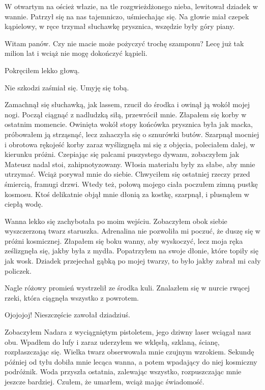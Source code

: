 W otwartym na oścież włazie, na tle rozgwieżdżonego nieba, lewitował dziadek w wannie.
Patrzył się na nas tajemniczo, uśmiechając się. Na głowie miał czepek kąpielowy, w ręce trzymał słuchawkę prysznica, wszędzie były góry piany.
\begin{dialogue}
\ds{} Witam panów. Czy nie macie może pożyczyć trochę szamponu? Lecę już tak milion lat i wciąż nie mogę dokończyć kąpieli.
\end{dialogue}
Pokręciłem lekko głową.
\begin{dialogue}
\ds{} Nie szkodzi \dm{} zaśmiał się. \dm{} Umyję się tobą.
\end{dialogue}
Zamachnął się słuchawką, jak lassem, rzucił do środka i owinął ją wokół mojej nogi.
Począł ciągnąć z nadludzką siłą, przewrócił mnie. Złapałem się korby w ostatnim momencie.
Owinięta wokół stopy końcówka prysznica była jak macka, próbowałem ją strząsnąć, lecz zahaczyła się o sznurówki butów.
Szarpnął mocniej i obrotowa rękojeść korby zaraz wyślizgnęła mi się z objęcia, poleciałem dalej, w kierunku próżni.
Czepiając się palcami puszystego dywanu, zobaczyłem jak Mateusz nadal stoi, zahipnotyzowany.
Włosia materiału były za słabe, aby mnie utrzymać. Wciąż porywał mnie do siebie. Chwyciłem się ostatniej rzeczy przed śmiercią, framugi drzwi.
Wtedy też, połową mojego ciała poczułem zimną pustkę kosmosu.
Ktoś delikatnie objął mnie dłonią za kostkę, szarpnął, i plusnąłem w ciepłą wodę.

Wanna lekko się zachybotała po moim wejściu.
Zobaczyłem obok siebie wyszczerzoną twarz staruszka.
Adrenalina nie pozwoliła mi poczuć, że duszę się w próżni kosmicznej.
Złapałem się boku wanny, aby wyskoczyć, lecz moja ręka ześlizgnęła się, jakby była z mydła.
Popatrzyłem na swoje dłonie, które topiły się jak wosk.
Dziadek przejechał gąbką po mojej twarzy, to było jakby zabrał mi cały policzek.

Nagle różowy promień wystrzelił ze środka kuli.
Znalazłem się w nurcie rwącej rzeki, która ciągnęła wszystko z powrotem.
\begin{dialogue}
\ds{} Ojojojoj! Nieszczęście \dm{} zawołał dziadziuś.
\end{dialogue}
Zobaczyłem Nadara z wyciągniętym pistoletem, jego dziwny laser wciągał nasz obu. Wpadłem do lufy i zaraz uderzyłem we wklęsłą, szklaną, ścianę, rozpłaszczając się.
Wielka twarz obserwowała mnie czujnym wzrokiem.
Sekundę później od tyłu dobiła mnie lecąca wanna, a potem wpadający do niej kosmiczny podróżnik.
Woda przyszła ostatnia, zalewając wszystko, rozpuszczając mnie jeszcze bardziej.
Czułem, że umarłem, wciąż mając świadomość.

